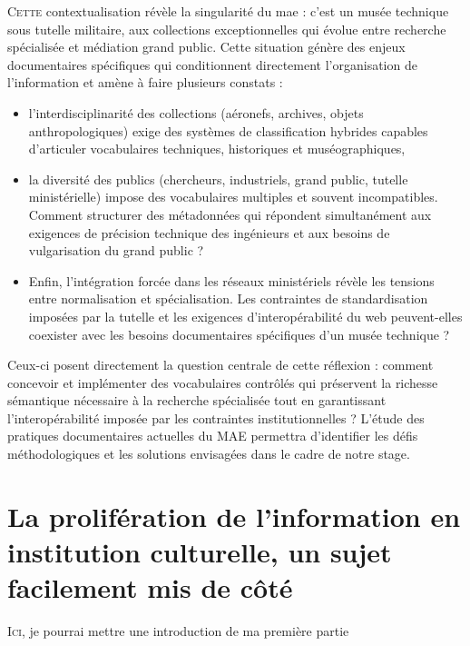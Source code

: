 \documentclass[12pt,twoside]{book}
\newcommand{\maelong}{\acf{mae} }
\begin{document}
	\lettrine{C}{ette} contextualisation révèle la singularité du \maelong : c'est un musée technique sous tutelle militaire, aux collections exceptionnelles qui évolue entre recherche spécialisée et médiation grand public. Cette situation génère des enjeux documentaires spécifiques qui conditionnent directement l'organisation de l'information et amène à faire plusieurs constats : 
	\begin{itemize}
		\item l'interdisciplinarité des collections (aéronefs, archives, objets anthropologiques) exige des systèmes de classification hybrides capables d'articuler vocabulaires techniques, historiques et muséographiques,
		\item la diversité des publics (chercheurs, industriels, grand public, tutelle ministérielle) impose des vocabulaires multiples et souvent incompatibles. Comment structurer des métadonnées qui répondent simultanément aux exigences de précision technique des ingénieurs et aux besoins de vulgarisation du grand public ?
		\item Enfin, l'intégration forcée dans les réseaux ministériels révèle les tensions entre normalisation et spécialisation. Les contraintes de standardisation imposées par la tutelle et les exigences d'interopérabilité du web peuvent-elles coexister avec les besoins documentaires spécifiques d'un musée technique ?
	\end{itemize}
	
	Ceux-ci posent directement la question centrale de cette réflexion : comment concevoir et implémenter des vocabulaires contrôlés qui préservent la richesse sémantique nécessaire à la recherche spécialisée tout en garantissant l'interopérabilité imposée par les contraintes institutionnelles ? L'étude des pratiques documentaires actuelles du MAE permettra d'identifier les défis méthodologiques et les solutions envisagées dans le cadre de notre stage.
	
	
	\part{La prolifération de l'information en institution culturelle, un sujet facilement mis de côté}
	
	
	\lettrine{I}{ci}, je pourrai mettre une introduction de ma première partie
	
\end{document}
